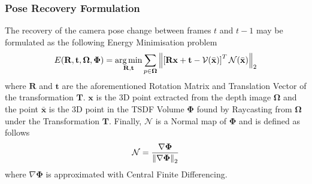 \subsubsection{Pose Recovery Formulation}
\label{subsub:moseg_static_camera_poserec}
The recovery of the camera pose change between frames $t$ and $t-1$ may be
formulated as the following Energy Minimisation problem
\begin{equation}
  \label{eqn:pose_estimation_kf}
  E(\mathbf{R}, \mathbf{t}, \mathbf{\Omega}, \mathbf{\Phi}) =
  \operatorname*{arg\,min}_{\mathbf{R}, \mathbf{t}} \sum_{p \in \mathbf{\Omega}}
  \left\lVert\left[
    \mathbf{Rx} + \mathbf{t} - \mathcal{V}(\bar{\mathbf{x}})
  \right]^{T}
  \mathcal{N}(\bar{\mathbf{x}})\right\rVert_{2}
\end{equation}
where $\mathbf{R}$ and $\mathbf{t}$ are the aforementioned Rotation Matrix and
Translation Vector of the transformation $\mathbf{T}$. $\mathbf{x}$ is the 3D
point extracted from the depth image $\mathbf{\Omega}$ and the point
$\bar{\mathbf{x}}$ is the 3D point in the TSDF Volume $\mathbf{\Phi}$ found by
Raycasting from $\mathbf{\Omega}$ under the Transformation $\mathbf{T}$.
Finally, $\mathcal{N}$ is a Normal map of $\mathbf{\Phi}$ and is defined as
follows
\begin{equation}
  \label{eqn:normal_map_definition}
  \mathcal{N} = \frac{\nabla \mathbf{\Phi}}{\left\lVert\nabla \mathbf{\Phi}\right\rVert_{2}}
\end{equation}
where $\nabla \mathbf{\Phi}$ is approximated with Central Finite Differencing.

